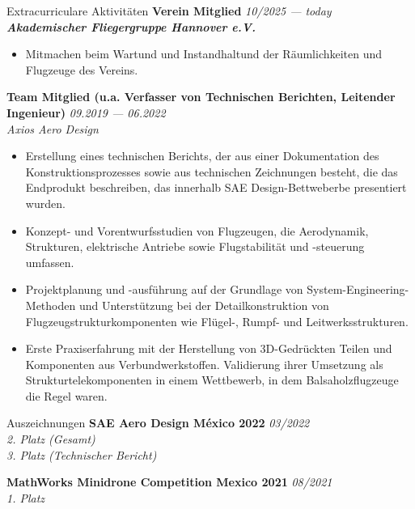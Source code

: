 \documentclass[a4paper]{resume} %
\begin{document}
    
    \begin{rSection}{Extracurriculare Aktivitäten}
      	{\bf Verein Mitglied} \hfill {\itshape 10/2025 --- today} 
    	\\{\textit{\textbf{Akademischer Fliegergruppe Hannover e.V.}}}
    	\vspace{-0.5em}
    	\begin{itemize}
    		\item Mitmachen beim Wartund und Instandhaltund der Räumlichkeiten und Flugzeuge des Vereins.
    	\end{itemize}
    	
    	
        {\bf Team Mitglied (u.a. Verfasser von Technischen Berichten, Leitender Ingenieur)} \hfill {\itshape 09.2019 --- 06.2022} 
        \\{\textit{Axios Aero Design}}
        
        \begin{itemize}
        	\item Erstellung eines technischen Berichts, der aus einer Dokumentation des Konstruktionsprozesses sowie aus technischen Zeichnungen besteht, die das Endprodukt beschreiben, das innerhalb SAE Design-Bettweberbe presentiert wurden.
            \item Konzept- und Vorentwurfsstudien von Flugzeugen, die Aerodynamik, Strukturen, elektrische Antriebe sowie Flugstabilität und -steuerung umfassen. 
            \item Projektplanung und -ausführung auf der Grundlage von System-Engineering-Methoden und Unterstützung bei der Detailkonstruktion von Flugzeugstrukturkomponenten wie Flügel-, Rumpf- und Leitwerksstrukturen.
            \item Erste Praxiserfahrung mit der Herstellung von 3D-Gedrückten Teilen und Komponenten aus Verbundwerkstoffen. Validierung ihrer Umsetzung als Strukturtelekomponenten in einem Wettbewerb, in dem Balsaholzflugzeuge die Regel waren.
        \end{itemize}
    \end{rSection}
    
    \begin{rSection}{Auszeichnungen}
        {\bf SAE Aero Design México 2022} \hfill {\itshape 03/2022}
        \\{\textit{2. Platz (Gesamt)}}
        \\{\textit{3. Platz (Technischer Bericht)}}
    
        {\bf MathWorks Minidrone Competition Mexico 2021} \hfill {\itshape 08/2021}
        \\{\textit{1. Platz}}
    \end{rSection}
\end{document}
